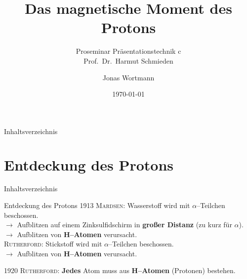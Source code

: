 \documentclass[t,9pt]{beamer}
\title[\thesection]{Das magnetische Moment des Protons}
\subtitle{Proseminar Präsentationstechnik c \\\tiny Prof.\ Dr.\ Harmut Schmieden}
\author{Jonas Wortmann}
\institute{Universität Bonn}
\date{\today}
\begin{document}

        \begin{frame}
                \titlepage
        \end{frame}

        \begin{frame}{Inhaltsverzeichnis}
                \tableofcontents[pausesections]
        \end{frame}

        \section{Entdeckung des Protons}

        \begin{frame}{Inhaltsverzeichnis}
                \tableofcontents[currentsection]
        \end{frame}

        \begin{frame}{Entdeckung des Protons}
                \pause
                1913 \textsc{Mardsen}: Wasserstoff wird mit $\alpha $--Teilchen beschossen.
                \\\vspace{.1cm} $\rightarrow $ Aufblitzen auf einem Zinksulfidschirm in \textbf{großer Distanz} (zu kurz für $\alpha $).
                \\ $\rightarrow $ Aufblitzen von \textbf{H--Atomen} verursacht.
                \pause
                \\\vspace{.5cm} \textsc{Rutherford}: Stickstoff wird mit $\alpha $--Teilchen beschossen.
                \\\vspace{.1cm} $\rightarrow $ Aufblitzen von \textbf{H--Atomen} verursacht.
                \pause
                \begin{center}
                \end{center}
                \pause
                \vspace{.5cm}1920 \textsc{Rutherford}: \textbf{Jedes} Atom muss aus \textbf{H--Atomen} (Protonen) bestehen.\cite{Rutherford_proton_discovery}
        \end{frame}
\end{document}
